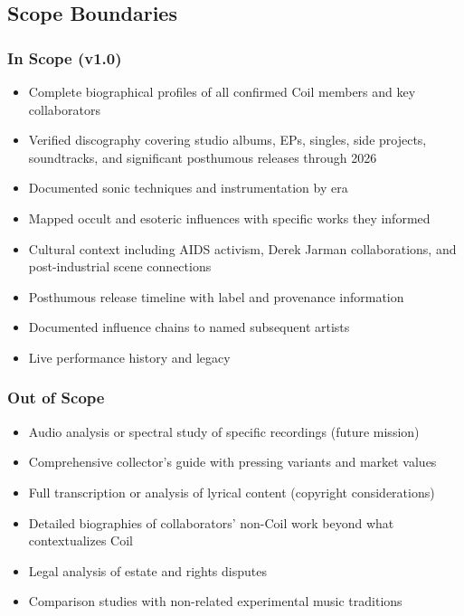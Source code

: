 \documentclass[11pt,letterpaper]{article}
\begin{document}
\subsection{Scope Boundaries}

\subsubsection{In Scope (v1.0)}

\begin{itemize}[leftmargin=2em]
\item Complete biographical profiles of all confirmed Coil members and key collaborators
\item Verified discography covering studio albums, EPs, singles, side projects, soundtracks, and significant posthumous releases through 2026
\item Documented sonic techniques and instrumentation by era
\item Mapped occult and esoteric influences with specific works they informed
\item Cultural context including AIDS activism, Derek Jarman collaborations, and post-industrial scene connections
\item Posthumous release timeline with label and provenance information
\item Documented influence chains to named subsequent artists
\item Live performance history and legacy
\end{itemize}

\subsubsection{Out of Scope}

\begin{itemize}[leftmargin=2em]
\item Audio analysis or spectral study of specific recordings (future mission)
\item Comprehensive collector's guide with pressing variants and market values
\item Full transcription or analysis of lyrical content (copyright considerations)
\item Detailed biographies of collaborators' non-Coil work beyond what contextualizes Coil
\item Legal analysis of estate and rights disputes
\item Comparison studies with non-related experimental music traditions
\end{itemize}
\end{document}
